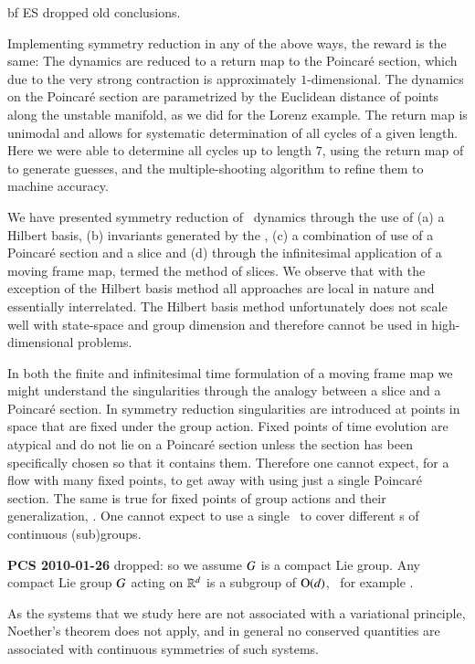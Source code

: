 {bf ES dropped old conclusions.}

Implementing symmetry reduction in any of the above ways, the
reward is the same: The dynamics are reduced to a return map
to the Poincar\'e section, which due to the very strong
contraction is approximately $1$-dimensional. The dynamics on
the Poincar\'e section are parametrized by the Euclidean
distance of points along the unstable manifold, as we did for
the Lorenz example. The return map is unimodal and allows for
systematic determination of all cycles of a given length.
Here we were able to determine all cycles up to length $7$,
using the return map of  to generate
guesses, and the multiple-shooting algorithm
to refine them to machine accuracy.

We have presented symmetry reduction of \cLe\ dynamics through the use of
(a) a Hilbert basis,  (b) invariants generated by the {\mframes},
(c) a combination of use of a Poincar\'e section and a slice and (d) through
the infinitesimal application of a moving frame map, termed the method of
slices. We observe that with the exception of the Hilbert basis method all
approaches are local in nature and essentially interrelated. The Hilbert basis
method unfortunately does not scale well with state-space and group dimension
and therefore cannot be used in high-dimensional problems.

In both the finite and infinitesimal time formulation of a moving frame map
we might understand the singularities through the analogy between a slice
and a Poincar\'e section. In symmetry reduction singularities
are introduced at points in space that are fixed under the group action.
Fixed points of time evolution are atypical and do not lie on a Poincar\'e section
unless the section has been specifically chosen so that it contains them.
Therefore one cannot expect, for a flow with many fixed points, to
get away with using just a single Poincar\'e section. The same is
true for fixed points of group actions and their generalization, \fixedsp.
One cannot expect to use a single \slice\ to cover different \fixedsp s
of continuous (sub)groups.

{\bf PCS 2010-01-26} dropped:
    so we assume $G$ is a compact Lie group.
    Any compact Lie group $G$ acting on $\mathbb{R}^{d}$ is
    a subgroup of $\textrm{O}(d)$, \cf\ for example .



As the systems that we study here are not associated with a
variational principle, Noether's theorem does not
apply, and in general no conserved
quantities are associated with continuous symmetries of
such systems.


